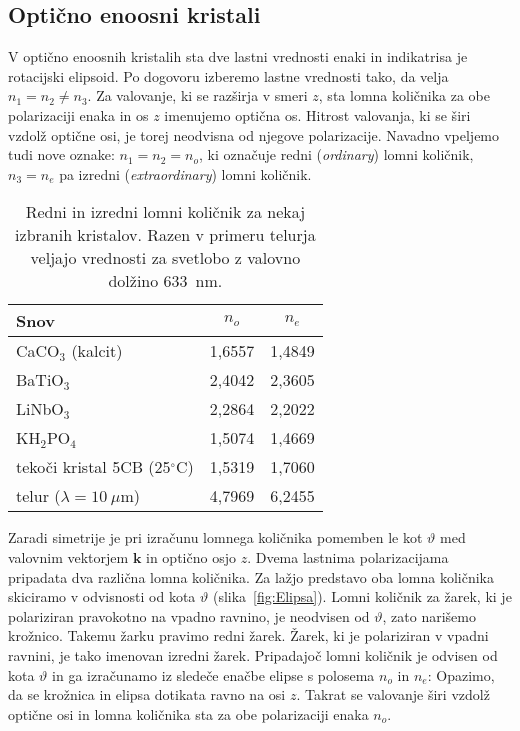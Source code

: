 \subsection*{Optično enoosni kristali}
V optično enoosnih kristalih sta dve lastni vrednosti enaki in indikatrisa je rotacijski 
elipsoid. Po dogovoru izberemo lastne vrednosti tako, da velja $n_{1}=n_{2}\neq n_{3}$. 
Za valovanje, ki se razširja v smeri $z$, sta lomna količnika za obe polarizaciji 
enaka in os $z$ imenujemo optična os. Hitrost valovanja, ki
se širi vzdolž optične osi, je torej neodvisna od njegove polarizacije.
Navadno vpeljemo tudi nove oznake: $n_{1}=n_{2}=n_{o}$, ki označuje redni (\textit{ordinary})
lomni količnik, $n_{3}=n_{e}$ pa izredni 
(\textit{extraordinary}) lomni količnik. 

\begin{table}[h]
 \centering
\begin{tabular}{|l|c|c|} \hline  
      Snov & $n_o$ & $n_e$ \\ \hline
      CaCO$_3$ (kalcit) & 1,6557 & 1,4849 \\ \hline
      BaTiO$_3$ & 2,4042 & 2,3605 \\ \hline
      LiNbO$_3$ & 2,2864 & 2,2022 \\ \hline
      KH$_2$PO$_4$ & 1,5074 & 1,4669 \\ \hline
      tekoči kristal 5CB (25$^\circ$C) & 1,5319 & 1,7060 \\ \hline
      telur ($\lambda = 10~\mu$m) & 4,7969 & 6,2455 \\
\hline 
\end{tabular}
  \caption{Redni in izredni lomni količnik za nekaj izbranih kristalov. Razen v primeru telurja
   veljajo vrednosti za svetlobo z valovno dolžino 633~nm.}
\label{table:none}
\end{table}

Zaradi simetrije je pri izračunu lomnega količnika pomemben le kot 
$\vartheta$ med valovnim vektorjem $\mathbf{k}$ in optično osjo $z$. Dvema 
lastnima polarizacijama pripadata dva različna lomna količnika. 
Za lažjo predstavo oba lomna količnika skiciramo v odvisnosti
od kota $\vartheta$ (slika~\ref{fig:Elipsa}). Lomni količnik za žarek, ki
je polariziran pravokotno na vpadno ravnino, je neodvisen od $\vartheta$, zato narišemo krožnico.
Takemu žarku pravimo redni žarek. 
Žarek, ki je polariziran v vpadni ravnini, je tako imenovan izredni žarek. Pripadajoč
lomni količnik je odvisen od kota $\vartheta$ in ga izračunamo iz sledeče enačbe elipse
s polosema $n_o$ in $n_e$: 
Opazimo, da se krožnica in elipsa dotikata ravno na osi $z$. Takrat se 
valovanje širi vzdolž optične osi in lomna količnika sta za obe polarizaciji enaka $n_o$. 

